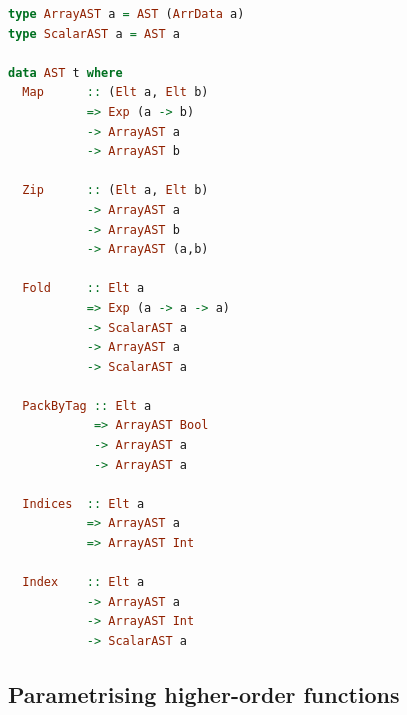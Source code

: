 \documentclass[preamble.tex]{subfiles}
\begin{document}
\begin{lstlisting}[basicstyle={\ttfamily},language=Haskell]
type ArrayAST a = AST (ArrData a)
type ScalarAST a = AST a

data AST t where
  Map      :: (Elt a, Elt b)
           => Exp (a -> b)
           -> ArrayAST a
           -> ArrayAST b

  Zip      :: (Elt a, Elt b)
           -> ArrayAST a
           -> ArrayAST b
           -> ArrayAST (a,b)

  Fold     :: Elt a
           => Exp (a -> a -> a)
           -> ScalarAST a
           -> ArrayAST a
           -> ScalarAST a

  PackByTag :: Elt a
            => ArrayAST Bool
            -> ArrayAST a
            -> ArrayAST a

  Indices  :: Elt a
           => ArrayAST a
           => ArrayAST Int

  Index    :: Elt a
           -> ArrayAST a
           -> ArrayAST Int
           -> ScalarAST a
\end{lstlisting}



\subsection{Parametrising higher-order functions}
\end{document}
